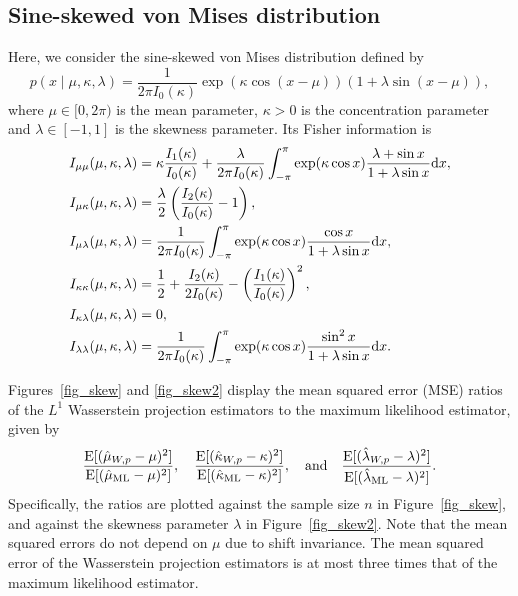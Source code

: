 \documentclass[11pt, a4paper]{article}
\begin{document}
\subsection{Sine-skewed von Mises distribution}
Here, we consider the sine-skewed von Mises distribution \cite{skewed} defined by
\[
p(x \mid \mu, \kappa, \lambda) = \frac{1}{2\pi I_{0}(\kappa)} \exp (\kappa \cos(x - \mu) ) (1 + \lambda \sin(x - \mu)),
\]
where $\mu \in [0,2\pi)$ is the mean parameter, $\kappa>0$ is the concentration parameter and $\lambda \in [-1,1]$ is the skewness parameter.
Its Fisher information is
\begin{align*}
	I_{\mu \mu} (\mu, \kappa, \lambda) &= \kappa \dfrac{I_{1}(\kappa)}{I_{0}(\kappa)}
	+ \dfrac{\lambda}{2\pi I_{0}(\kappa)} \int_{-\pi}^{\pi} \exp (\kappa \cos x)
	\frac{\lambda + \sin x}{1 + \lambda \sin x} {\rm d} x, \\
	I_{\mu \kappa} (\mu, \kappa, \lambda) &=  \frac{\lambda}{2} \left(\frac{I_{2}(\kappa)}{I_{0}(\kappa)} - 1 \right), \\
	I_{\mu \lambda} (\mu, \kappa, \lambda) &= \frac{1}{2\pi I_{0}(\kappa)} \int_{-\pi}^{\pi} \exp (\kappa \cos x)
	\frac{\cos x}{1+\lambda \sin x} {\rm d} x, \\
	I_{\kappa \kappa} (\mu, \kappa, \lambda) &= \frac{1}{2} + \frac{I_{2}(\kappa)}{2 I_{0}(\kappa)} - 
	\left(\frac{I_{1}(\kappa)}{I_{0}(\kappa)}\right)^{2}, \\
	I_{\kappa \lambda} (\mu, \kappa, \lambda) &=  0, \\
	I_{\lambda \lambda} (\mu, \kappa, \lambda) &= \frac{1}{2\pi I_{0}(\kappa)} \int_{-\pi}^{\pi} \exp (\kappa \cos x)
	\frac{\sin^{2} x}{1+\lambda \sin x} {\rm d} x.
\end{align*}

Figures~\ref{fig_skew} and \ref{fig_skew2} display the mean squared error (MSE) ratios of the $L^1$ Wasserstein projection estimators to the maximum likelihood estimator, given by
\[
\frac{{\rm E}[(\hat{\mu}_{W,p}-\mu)^2]}{{\rm E}[(\hat{\mu}_{\mathrm{ML}}-\mu)^2]}, \quad \frac{{\rm E}[(\hat{\kappa}_{W,p}-\kappa)^2]}{{\rm E}[(\hat{\kappa}_{\mathrm{ML}}-\kappa)^2]}, \quad \text{and} \quad \frac{{\rm E}[(\hat{\lambda}_{W,p}-\lambda)^2]}{{\rm E}[(\hat{\lambda}_{\mathrm{ML}}-\lambda)^2]}.
\]
Specifically, the ratios are plotted against the sample size $n$ in Figure~\ref{fig_skew}, and against the skewness parameter $\lambda$ in Figure~\ref{fig_skew2}.
Note that the mean squared errors do not depend on $\mu$ due to shift invariance.
The mean squared error of the Wasserstein projection estimators is at most three times that of the maximum likelihood estimator.
\end{document}
